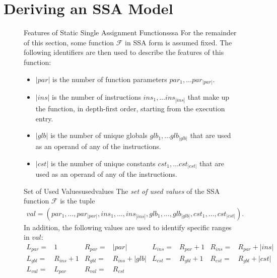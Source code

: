 \section{Deriving an SSA Model}
\label{sec:derivingamodel}

\begin{figure}[p]
\begin{definition}{Features of Static Single Assignment Functions}{ssa}
    For the remainder of this section, some function $\mathcal F$ in SSA form is
    assumed fixed. 
    The following identifiers are then used to describe the features of this
    function:

    \begin{itemize}[topsep=0pt,itemsep=0pt,partopsep=0pt,parsep=0pt]
    \item $|par|$ is the number of function parameters
          $par_1,\dots par_{|par|}$.
    \item $|ins|$ is the number of instructions $ins_1,\dots ins_{|ins|}$ that
          make up the function, in depth-first order, starting from the
          execution entry.
    \item $|glb|$ is the number of unique globals $glb_1,\dots glb_{|glb|}$ that
          are used as an operand of any of the instructions.
    \item $|cst|$ is the number of unique constants $cst_1,\dots cst_{|cst|}$
          that are used as an operand of any of the instructions.
    \end{itemize}
\end{definition}
\begin{definition}{Set of Used Values}{usedvalues}
    The {\em set of used values} of the SSA function $\mathcal F$ is the tuple
    \begin{align*}
       val = (par_1,\dots,par_{|par|},
              ins_1,\dots,ins_{|ins|},
              glb_1,\dots,glb_{|glb|},
              cst_1,\dots,cst_{|cst|}).
    \end{align*}
    In addition, the following values are used to identify specific ranges in
    $val$:
    \begin{align*}
        L_{par}={}&1         & R_{par}={}&|par| &
        L_{ins}={}&R_{par}+1 & R_{ins}={}&R_{par}+|ins|\\[-1.5mm]
        L_{gbl}={}&R_{ins}+1 & R_{gbl}={}&R_{ins}+|glb| &
        L_{cst}={}&R_{gbl}+1 & R_{cst}={}&R_{gbl}+|cst|\\[-1.5mm]
        L_{val}={}&L_{par}   & R_{val}={}&R_{cst} &&&&
    \end{align*}

\end{definition}
\end{figure}
